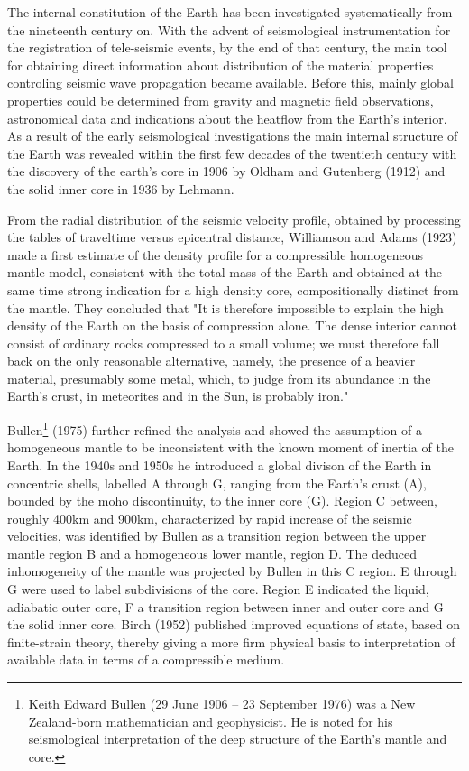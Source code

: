 The internal constitution of the Earth has been investigated 
systematically from the nineteenth century on.
With the advent of seismological instrumentation for
the registration of tele-seismic events,
by the end of that century, the main tool for
obtaining direct information about distribution of the material 
properties controling seismic wave propagation became available.
Before this, mainly global properties could be determined from
gravity and magnetic field observations, astronomical data and 
indications about the heatflow from the Earth's interior.
As a result of the early seismological investigations the
main internal structure of the Earth was revealed within the 
first few decades of the twentieth century with the discovery of the
earth's core in 1906 by Oldham and Gutenberg (1912) and the solid 
inner core in 1936 by Lehmann. 

From the radial distribution of the seismic velocity profile, 
obtained by processing the tables of 
traveltime versus epicentral distance, Williamson and Adams (1923) \cite{wiad23}
made a first estimate of the density profile for a compressible
homogeneous mantle model,
consistent with the total mass of the Earth
and obtained at the same time strong indication 
for a high density core, compositionally distinct from the mantle.
They concluded that "It is therefore impossible to explain the high density of the Earth 
on the basis of compression alone. The dense interior cannot consist of ordinary rocks 
compressed to a small volume; we must therefore fall back on the only reasonable alternative, 
namely, the presence of a heavier material, presumably some metal, which, 
to judge from its abundance in the Earth's crust, in meteorites and in the Sun, is probably iron."
 
Bullen\footnote{Keith Edward Bullen (29 June 1906 – 23 September 1976) was a 
New Zealand-born mathematician and geophysicist. He is noted for his seismological interpretation of 
the deep structure of the Earth's mantle and core.} (1975) \cite{bull75} 
further refined the analysis and showed the assumption 
of a homogeneous mantle to be inconsistent with the known moment of 
inertia of the Earth.
In the 1940s and 1950s he introduced a global divison of the
Earth in concentric shells, labelled A through G, ranging from the
Earth's crust (A), bounded by the moho discontinuity, 
to the inner core (G).
Region C between, roughly 400km and 900km, characterized by rapid 
increase of the seismic velocities, was identified by Bullen as
a transition region between the upper mantle region B and a
homogeneous lower mantle, region D.
The deduced inhomogeneity of the mantle was projected by Bullen in this
C region. 
E through G were used to label subdivisions of the core.
Region E indicated the liquid, adiabatic outer core,
F a transition region between inner and outer core and G the solid
inner core.
Birch (1952) \cite{birc52} published improved equations of state,
based on finite-strain theory,
thereby giving a more firm physical basis to interpretation of 
available data in terms of a compressible medium.
  
